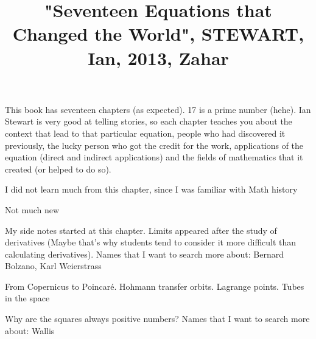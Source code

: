 \documentclass{cornell}
\begin{document}
 

\title{
    \vspace{-3em}
        \begin{tcolorbox}[colframe=white,opacityback=0]
            \begin{tcolorbox}
                \Huge\sffamily "Seventeen Equations that Changed the World", STEWART, Ian, 2013, Zahar
            \end{tcolorbox}
        \end{tcolorbox}
    \vspace{-3em}
}
\maketitle

\begin{tcolorbox}
\end{tcolorbox}


\noindent
This book has seventeen chapters (as expected). 17 is a prime number (hehe). Ian Stewart is very good at telling stories, so each chapter teaches you about the context that lead to that particular equation, people who had discovered it previously, the lucky person who got the credit for the work, applications of the equation (direct and indirect applications) and the fields of mathematics that it created (or helped to do so).

%
{I did not learn much from this chapter, since I was familiar with Math history}%

%
{Not much new}%

%
{My side notes started at this chapter. Limits appeared after the study of derivatives (Maybe that's why students tend to consider it more difficult than calculating derivatives).}%
{Names that I want to search more about: Bernard Bolzano, Karl Weierstrass}%

%
{From Copernicus to Poincaré. Hohmann transfer orbits. Lagrange points. Tubes in the space}%

%
{Why are the squares always positive numbers?}%
{Names that I want to search more about: Wallis}%
\end{document}
